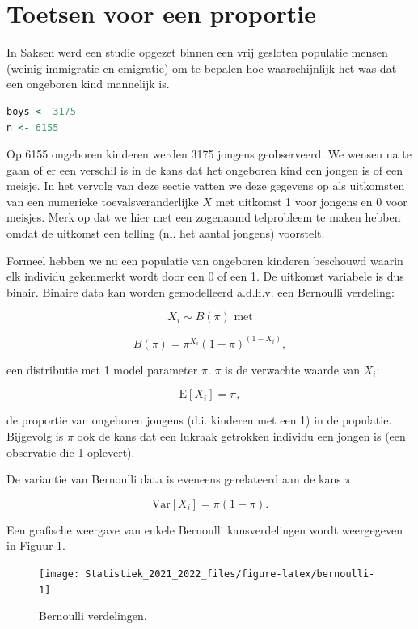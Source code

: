 \documentclass[
  12pt,dutch,coursenotes]{book}
\theoremstyle{definition}
\theoremstyle{definition}
\theoremstyle{definition}
\theoremstyle{definition}
\theoremstyle{remark}
\begin{document}
\hypertarget{toetsen-voor-een-proportie}{%
\section{Toetsen voor een proportie}\label{toetsen-voor-een-proportie}}

In Saksen werd een studie opgezet binnen een vrij gesloten populatie mensen (weinig immigratie en emigratie) om te bepalen hoe waarschijnlijk het was dat een ongeboren kind mannelijk is.

\begin{lstlisting}[language=R]
boys <- 3175
n <- 6155
\end{lstlisting}

Op 6155 ongeboren kinderen werden 3175 jongens
geobserveerd.
We wensen na te gaan of er een verschil is in de kans dat het ongeboren kind een jongen is of een meisje.
In het vervolg van deze sectie vatten we deze gegevens op als uitkomsten van een numerieke toevalsveranderlijke \(X\) met uitkomst 1 voor jongens en 0 voor meisjes.
Merk op dat we hier met een zogenaamd telprobleem te maken hebben omdat de uitkomst een telling (nl. het aantal jongens) voorstelt.

Formeel hebben we nu een populatie van ongeboren kinderen beschouwd
waarin elk individu gekenmerkt wordt door een 0 of een 1.
De uitkomst variabele is dus binair.
Binaire data kan worden gemodelleerd a.d.h.v. een Bernoulli verdeling:

\[X_i \sim B(\pi) \text{ met}\]

\[B(\pi)=\pi^{X_i}(1-\pi)^{(1-X_i)},\]

een distributie met 1 model parameter \(\pi\).
\(\pi\) is de verwachte waarde van \(X_i\):

\[\text{E}[X_i]=\pi,\]

de proportie van ongeboren jongens (d.i. kinderen met een 1) in
de populatie.
Bijgevolg is \(\pi\) ook de kans dat een lukraak getrokken individu een jongen is (een observatie die 1 oplevert).

De variantie van Bernoulli data is eveneens gerelateerd aan de kans \(\pi\).

\[\text{Var}[X_i]=\pi (1-\pi).\]

Een grafische weergave van enkele Bernoulli kansverdelingen wordt weergegeven in Figuur \ref{fig:bernoulli}.

\begin{figure}

{\centering \texttt{[image: Statistiek\_2021\_2022\_files/figure-latex/bernoulli-1]} 

}

\caption{Bernoulli verdelingen.}\label{fig:bernoulli}
\end{figure}
\end{document}
